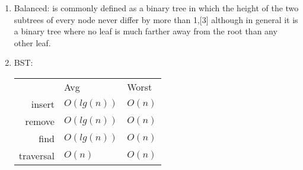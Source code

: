 \documentclass[12pt]{article}
\renewcommand{\=}[1]{\stackrel{#1}{=}} %
\theoremstyle{definition}
\theoremstyle{remark}
\begin{document}
\begin{enumerate}
\begin{enumerate}
\begin{enumerate}
      \item Balanced: is commonly defined as a binary tree in which the height of the two subtrees of every node never differ by more than 1,[3] although in general it is a binary tree where no leaf is much farther away from the root than any other leaf.
      \item BST:
        \begin{tabular}{r l l}
          & Avg & Worst\\
          insert & $O(lg(n))$ & $O(n)$ \\
          remove & $O(lg(n))$ & $O(n)$ \\
          find & $O(lg(n))$ & $O(n)$ \\
          traversal & $O(n)$ & $O(n)$\\
        \end{tabular}


\end{enumerate}
\end{enumerate}
\end{enumerate}
\end{document}
